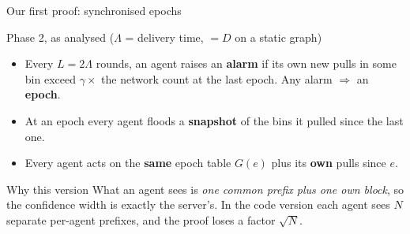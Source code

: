 \documentclass[11pt]{beamer}
\begin{document}
\begin{frame}{Our first proof: synchronised epochs}
\small
\begin{block}{Phase 2, as analysed ($\Lambda$ = delivery time, $=D$ on a static graph)}
\begin{itemize}
\item Every $L=2\Lambda$ rounds, an agent raises an \textbf{alarm} if its own new pulls in some bin exceed $\gamma\times$ the network count at the last epoch. Any alarm $\Rightarrow$ an \textbf{epoch}.
\item At an epoch every agent floods a \textbf{snapshot} of the bins it pulled since the last one.
\item Every agent acts on the \textbf{same} epoch table $G(e)$ plus its \textbf{own} pulls since $e$.
\end{itemize}
\end{block}
\begin{center}
\end{center}
\begin{alertblock}{Why this version}
What an agent sees is \emph{one common prefix plus one own block}, so the confidence width is exactly the server's. In the code version each agent sees $N$ separate per-agent prefixes, and the proof loses a factor $\sqrt N$.
\end{alertblock}
\end{frame}
\end{document}
